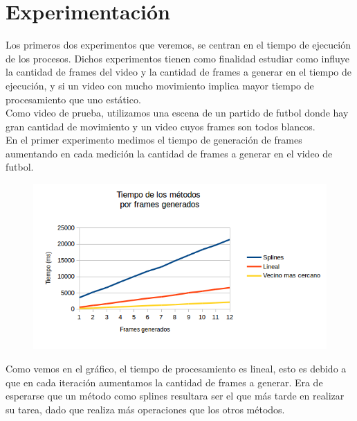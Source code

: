 \section{Experimentación}
Los primeros dos experimentos que veremos, se centran en el tiempo de ejecución de los procesos. Dichos experimentos tienen como finalidad estudiar como influye la cantidad de frames del video y la cantidad de frames a generar en el tiempo de ejecución, y si un video con mucho movimiento implica mayor tiempo de procesamiento que uno estático.\\

Como video de prueba, utilizamos una escena de un partido de futbol donde hay gran cantidad de movimiento y un video cuyos frames son todos blancos.\\

En el primer experimento medimos el tiempo de generación de frames aumentando en cada medición la cantidad de frames a generar en el video de futbol.

\begin{figure}
  \vspace{-20pt}
  \begin{center}
    \includegraphics[scale= 0.6]{imagenes/aumentandoFramesToAdd.png}
  \end{center}
  \vspace{-10pt}
  \vspace{-10pt}
\end{figure}

Como vemos en el gráfico, el tiempo de procesamiento es lineal, esto es debido a que en cada iteración aumentamos la cantidad de frames a generar. Era de esperarse que un método como splines resultara ser el que más tarde en realizar su tarea, dado que realiza más operaciones que los otros métodos. \\

